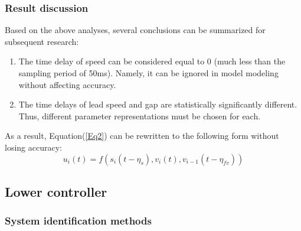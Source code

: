 \documentclass[journal]{IEEEtran}
\begin{document}
\subsubsection{Result discussion}
\label{Section 3.2.3}

Based on the above analyses, several conclusions can be summarized for subsequent research:
\begin{enumerate}
  \item The time delay of speed can be considered equal to 0 (much less than the sampling period of 50ms). Namely, it can be ignored in model modeling without affecting accuracy.
  \item The time delays of lead speed and gap are statistically significantly different. Thus, different parameter representations must be chosen for each.
\end{enumerate}

As a result, Equation(\ref{Eq2}) can be rewritten to the following form without losing accuracy:
\begin{equation}
  u_i\left(t\right)=f(s_i\left(t-\eta_s\right),v_i\left(t\right),v_{i-1}(t-\eta_{fv}))
  \label{Eq10}
\end{equation}


\subsection{Lower controller}
\label{Section 3.3}

\subsubsection{System identification methods}
\label{Section 3.3.1}
\end{document}
